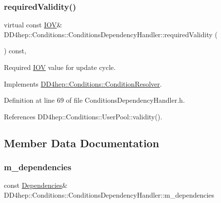 \subsubsection{\texorpdfstring{required\+Validity()}{requiredValidity()}}
{\footnotesize\ttfamily virtual const \hyperlink{class_d_d4hep_1_1_i_o_v}{I\+OV}\& D\+D4hep\+::\+Conditions\+::\+Conditions\+Dependency\+Handler\+::required\+Validity (\begin{DoxyParamCaption}{ }\end{DoxyParamCaption}) const\hspace{0.3cm}{\ttfamily [inline]}, {\ttfamily [virtual]}}



Required \hyperlink{class_d_d4hep_1_1_i_o_v}{I\+OV} value for update cycle. 



Implements \hyperlink{class_d_d4hep_1_1_conditions_1_1_condition_resolver_a96b82698fa08d7b1ecb46cd36f5e543f}{D\+D4hep\+::\+Conditions\+::\+Condition\+Resolver}.



Definition at line 69 of file Conditions\+Dependency\+Handler.\+h.



References D\+D4hep\+::\+Conditions\+::\+User\+Pool\+::validity().



\subsection{Member Data Documentation}
\hypertarget{class_d_d4hep_1_1_conditions_1_1_conditions_dependency_handler_a8ee531f77ba4feb9f1c767f59d0f607a}{}\label{class_d_d4hep_1_1_conditions_1_1_conditions_dependency_handler_a8ee531f77ba4feb9f1c767f59d0f607a} 
\subsubsection{\texorpdfstring{m\+\_\+dependencies}{m\_dependencies}}
{\footnotesize\ttfamily const \hyperlink{class_d_d4hep_1_1_conditions_1_1_conditions_dependency_handler_a4a063b30ffccb0e30f3302f1537aef10}{Dependencies}\& D\+D4hep\+::\+Conditions\+::\+Conditions\+Dependency\+Handler\+::m\+\_\+dependencies\hspace{0.3cm}{\ttfamily [protected]}}



